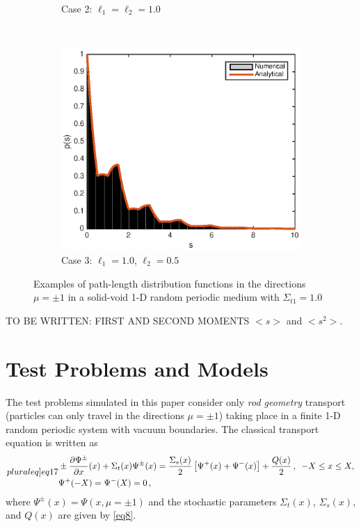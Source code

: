 \documentclass[12pt]{article}
\newcommand{\bl}{\big<}
\newcommand{\bg}{\big>}
\begin{document}
\begin{figure}[hbt]
\begin{subfigure}{0.495\textwidth}
        \caption{Case 2: $\ell_1=\ell_2=1.0$}
        \label{fig2b}
    \end{subfigure}
    \\
    \begin{subfigure}{0.495\textwidth}
        \centering
        \includegraphics[width=\textwidth]{fig2c.eps}
        \caption{Case 3: $\ell_1=1.0$, $\ell_2=0.5$}
        \label{fig2c}
    \end{subfigure}
    \caption{Examples of path-length distribution functions in the directions $\mu=\pm 1$ in a solid-void 1-D random periodic medium with $\Sigma_{t1}=1.0$ }
    \label{fig2}
\end{figure}

TO BE WRITTEN: FIRST AND SECOND MOMENTS $\bl s \bg$ and $\bl s^2\bg$.

\section{Test Problems and Models}\label{sec4}

The test problems simulated in this paper consider only {\em rod geometry} transport (particles can only travel in the directions $\mu = \pm1$) taking place in a finite 1-D random periodic system with vacuum boundaries.
The classical transport equation is written as
\begin{subequations}\label[pluraleq]{eq17}
\begin{align}
&\pm \frac{\partial \Psi^{\pm}}{\partial x}(x) + \Sigma_t(x)\Psi^{\pm}(x) 
= \frac{\Sigma_s(x)}{2}\left[\Psi^{+}(x)+\Psi^{-}(x)\right]+ \frac{Q(x)}{2}\,,
\,\,\,-X\leq x\leq X,\\
&\Psi^+(-X) = \Psi^-(X) = 0\,,
\end{align}
\end{subequations}
where $\Psi^{\pm}(x) = \Psi(x,\mu=\pm 1)$ and the stochastic parameters $\Sigma_t(x)$, $\Sigma_s(x)$, and $Q(x)$ are given by \cref{eq8}.
\end{document}
